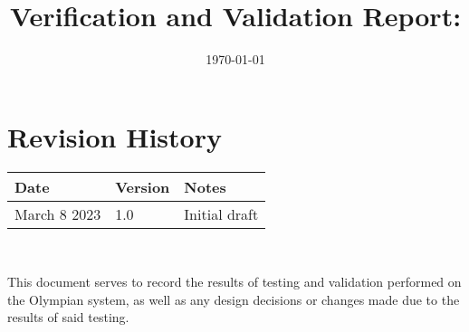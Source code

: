 \documentclass[12pt, titlepage]{article}
\begin{document}
\title{Verification and Validation Report: \progname} 
\author{\authname}
\date{\today}
	
\maketitle


\section{Revision History}

\begin{tabularx}{\textwidth}{p{3cm}p{2cm}X}
\toprule {\bf Date} & {\bf Version} & {\bf Notes}\\
\midrule
March 8 2023 & 1.0 & Initial draft\\
\bottomrule
\end{tabularx}

~\newpage

%


\newpage

\tableofcontents

\listoftables %

\listoffigures %

\newpage


This document serves to record the results of testing and validation performed on the Olympian system, as well as any design decisions or changes made due to the results of said testing.
\end{document}
